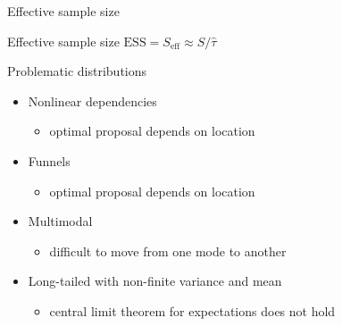 \documentclass[finnish,english,t]{beamer}
\def\eff{\text{eff}}
\def\ESS{\text{ESS}}
\begin{document}
\begin{frame}
  
   {\Large\color{navyblue} Effective sample size}

   Effective sample size $\ESS = S_\eff \approx S/\hat{\tau}$\\
   
\end{frame}

\begin{frame}{Problematic distributions}

  \begin{itemize}
  \item<1-> Nonlinear dependencies
    \begin{itemize}
    \item optimal proposal depends on location
    \end{itemize}
  \item<2-> Funnels
    \begin{itemize}
    \item optimal proposal depends on location
    \end{itemize}
  \item<3-> Multimodal
    \begin{itemize}
    \item difficult to move from one mode to another
    \end{itemize}
  \item<4-> Long-tailed with non-finite variance and mean
    \begin{itemize}
    \item central limit theorem for expectations does not hold
    \end{itemize}
  \end{itemize}

\end{frame}
\end{document}
